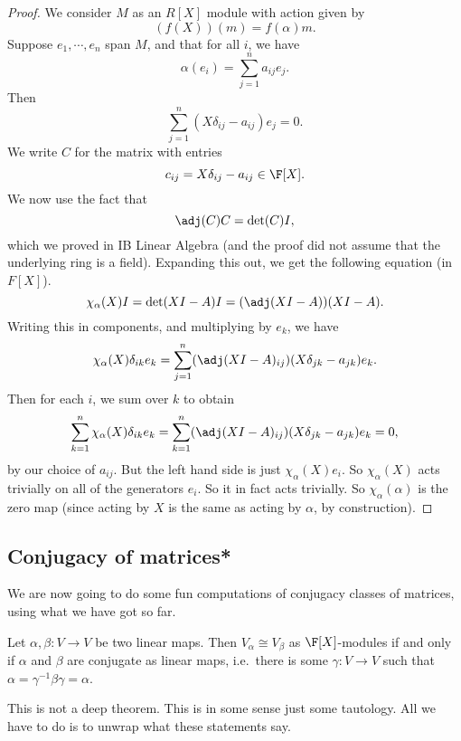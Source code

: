 \documentclass[a4paper]{article}
\begin{document}
\begin{proof}
  We consider $M$ as an $R[X]$ module with action given by
  \[
    (f(X))(m) = f(\alpha) m.
  \]
  Suppose $e_1, \cdots, e_n$ span $M$, and that for all $i$, we have
  \[
    \alpha(e_i) = \sum_{j = 1}^n a_{ij} e_j.
  \]
  Then
  \[
    \sum_{j = 1}^n (X \delta_{ij} - a_{ij}) e_j = 0.
  \]
  We write $C$ for the matrix with entries
  \[
    c_{ij} = X \delta_{ij} - a_{ij} \in \F[X].
  \]
  We now use the fact that
  \[
    \adj(C) C = \det(C) I,
  \]
  which we proved in IB Linear Algebra (and the proof did not assume that the underlying ring is a field). Expanding this out, we get the following equation (in $F[X]$).
  \[
    \chi_\alpha (X) I = \det(XI - A) I = (\adj(XI - A)) (XI - A).
  \]
  Writing this in components, and multiplying by $e_k$, we have
  \[
    \chi_\alpha(X) \delta_{ik}e_k = \sum_{j = 1}^n (\adj(XI - A)_{ij}) (X \delta_{jk} - a_{jk}) e_k.
  \]
  Then for each $i$, we sum over $k$ to obtain
  \[
    \sum_{k = 1}^n \chi_\alpha(X) \delta_{ik} e_k = \sum_{k = 1}^n (\adj(XI - A)_{ij}) (X \delta_{jk} - a_{jk}) e_k = 0,
  \]
  by our choice of $a_{ij}$. But the left hand side is just $\chi_{\alpha}(X) e_i$. So $\chi_\alpha(X)$ acts trivially on all of the generators $e_i$. So it in fact acts trivially. So $\chi_\alpha(\alpha)$ is the zero map (since acting by $X$ is the same as acting by $\alpha$, by construction).
\end{proof}

\subsection{Conjugacy of matrices*}
We are now going to do some fun computations of conjugacy classes of matrices, using what we have got so far.
\begin{lemma}
  Let $\alpha, \beta: V \to V$ be two linear maps. Then $V_\alpha\cong V_\beta$ as $\F[X]$-modules if and only if $\alpha$ and $\beta$ are conjugate as linear maps, i.e.\ there is some $\gamma: V \to V$ such that $\alpha = \gamma^{-1}\beta\gamma = \alpha$.
\end{lemma}
This is not a deep theorem. This is in some sense just some tautology. All we have to do is to unwrap what these statements say.
\end{document}
